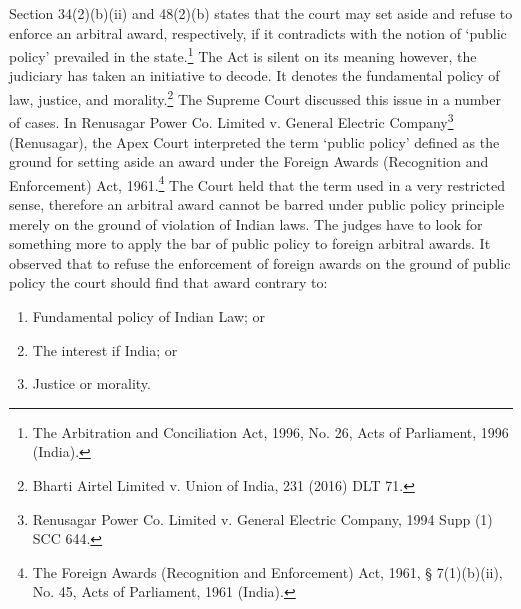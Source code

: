 \begin{multicols}{2}
\newpage


\vspace{-.15cm}

\noi
Section 34(2)(b)(ii) and 48(2)(b) states that the court may set aside and refuse to enforce an
arbitral award, respectively, if it contradicts with the notion of ‘public policy’ prevailed in the
state.\footnote{The Arbitration and Conciliation Act, 1996, No. 26, Acts of Parliament, 1996 (India).} The Act is silent on its meaning however, the judiciary has taken an initiative to decode. It denotes the fundamental policy of law, justice, and morality.\footnote{Bharti Airtel Limited v. Union of India, 231 (2016) DLT 71.} The Supreme Court
discussed this issue in a number of cases. In Renusagar Power Co. Limited v. General Electric
Company\footnote{Renusagar Power Co. Limited v. General Electric Company, 1994 Supp (1) SCC 644.} (Renusagar), the Apex Court interpreted the term ‘public policy’ defined as the
ground for setting aside an award under the Foreign Awards (Recognition and Enforcement)
Act, 1961.\footnote{The Foreign Awards (Recognition and Enforcement) Act, 1961, § 7(1)(b)(ii), No. 45, Acts of Parliament, 1961 (India).} The Court held that the term used in a very restricted sense, therefore an arbitral award cannot be barred under public policy principle merely on the ground of violation of Indian laws. The judges have to look for something more to apply the bar of public policy to
foreign arbitral awards. It observed that to refuse the enforcement of foreign awards on the
ground of public policy the court should find that award contrary to:

\vspace{-.4cm}

\begin{enumerate}[label=$(\alph*)$]
\itemsep=0pt
\item Fundamental policy of Indian Law; or

\item The interest if India; or

\item Justice or morality.
\end{enumerate}

\vspace{-.4cm}


\end{multicols}
